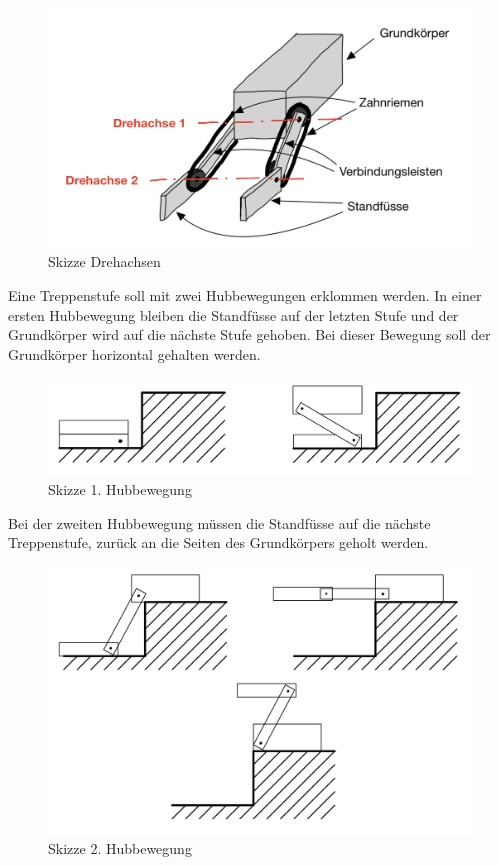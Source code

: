 \begin{figure}[H]
  \includegraphics[width=1\textwidth]{img/Treppensteigen/Skizze Drehachsen.png}
  \centering
  \caption{Skizze Drehachsen}
\end{figure}

Eine Treppenstufe soll mit zwei Hubbewegungen erklommen werden. In einer ersten Hubbewegung bleiben die Standfüsse auf der letzten Stufe und der Grundkörper wird auf die nächste Stufe gehoben. Bei dieser Bewegung soll der Grundkörper horizontal gehalten werden.

\begin{figure}[H]
  \includegraphics[width=1\textwidth]{img/Treppensteigen/1. Hubbewegung Skizze.png}
  \centering
  \caption{Skizze 1. Hubbewegung}
\end{figure}
 
 
Bei der zweiten Hubbewegung müssen die Standfüsse auf die nächste Treppenstufe, zurück an die Seiten des Grundkörpers geholt werden.

\begin{figure}[H]
  \includegraphics[width=1\textwidth]{img/Treppensteigen/2. Hubbewegung Skizze.png}
  \centering
  \caption{Skizze 2. Hubbewegung}
\end{figure}
 
